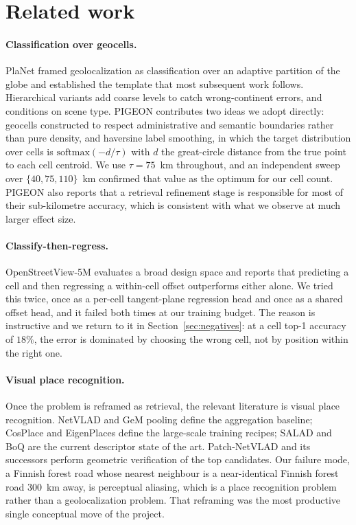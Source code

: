 \documentclass[11pt,a4paper]{article}
\begin{document}
\section{Related work}

\paragraph{Classification over geocells.}
PlaNet \cite{weyand2016planet} framed geolocalization as classification over an adaptive
partition of the globe and established the template that most subsequent work follows.
Hierarchical variants \cite{mullerbudack2018geolocation} add coarse levels to catch
wrong-continent errors, and \cite{clark2023where} conditions on scene type. PIGEON
\cite{haas2024pigeon} contributes two ideas we adopt directly: geocells constructed to
respect administrative and semantic boundaries rather than pure density, and haversine label
smoothing, in which the target distribution over cells is $\mathrm{softmax}(-d/\tau)$ with
$d$ the great-circle distance from the true point to each cell centroid. We use $\tau = 75$~km
throughout, and an independent sweep over $\{40, 75, 110\}$~km confirmed that value as the
optimum for our cell count. PIGEON also reports that a retrieval refinement stage is
responsible for most of their sub-kilometre accuracy, which is consistent with what we
observe at much larger effect size.

\paragraph{Classify-then-regress.}
OpenStreetView-5M \cite{astruc2024osv5m} evaluates a broad design space and reports that
predicting a cell and then regressing a within-cell offset outperforms either alone. We
tried this twice, once as a per-cell tangent-plane regression head and once as a shared
offset head, and it failed both times at our training budget. The reason is instructive and
we return to it in Section~\ref{sec:negatives}: at a cell top-1 accuracy of $18\%$, the error
is dominated by choosing the wrong cell, not by position within the right one.

\paragraph{Visual place recognition.}
Once the problem is reframed as retrieval, the relevant literature is visual place
recognition. NetVLAD \cite{arandjelovic2016netvlad} and GeM pooling
\cite{radenovic2019finetuning} define the aggregation baseline; CosPlace
\cite{berton2022rethinking} and EigenPlaces \cite{berton2023eigenplaces} define the
large-scale training recipes; SALAD \cite{izquierdo2024salad} and BoQ
\cite{alibey2024boq} are the current descriptor state of the art. Patch-NetVLAD
\cite{hausler2021patchnetvlad} and its successors perform geometric verification of the top
candidates. Our failure mode, a Finnish forest road whose nearest neighbour is a
near-identical Finnish forest road 300~km away, is perceptual aliasing, which is a place
recognition problem rather than a geolocalization problem. That reframing was the most
productive single conceptual move of the project.
\end{document}
